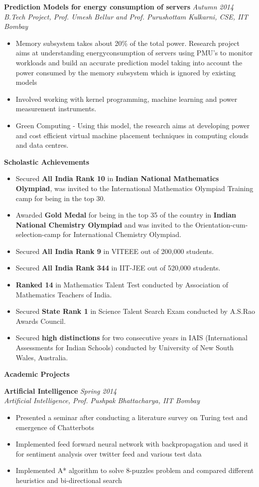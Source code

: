 \documentclass[a4paper,10pt]{article}
\newcommand{\resheading}[1]{
	{\large \colorbox{mygrey}{\begin{minipage}{\textwidth}{\textbf{#1 \vphantom{p\^{E}}}}\end{minipage}}}
}
\newcommand{\ressubheadingWithGuide}[3]{%

	\textbf{#1} \hfill \textit{#2}\null\\
	\textit{\small #3} %
	\vspace{-4pt}
}
\begin{document}
	\ressubheadingWithGuide{Prediction Models for energy consumption of servers}{Autumn 2014}{B.Tech Project, Prof. Umesh Bellur and Prof. Purushottam Kulkarni, CSE, IIT Bombay}
	\begin{itemize} \itemsep -1pt
		\item Memory subsystem takes about 20\% of the total power. Research project aims at understanding energyconsumption of servers using PMU’s to monitor workloads and build an accurate prediction model taking into account the power consumed by the memory subsystem which is ignored by existing models
		\item Involved working with kernel programming, machine learning and power measurement instruments.
		\item Green Computing - Using this model, the research aims at developing power and cost efficient virtual machine placement techniques in computing clouds and data centres.
 	\end{itemize}

\resheading{Scholastic Achievements} 
	\begin{itemize}\itemsep -1pt
	    	\item Secured \textbf{All India Rank 10} in \textbf{Indian National Mathematics Olympiad}, was invited to the International Mathematics Olympiad Training camp for being in the top 30.
			\item Awarded \textbf{Gold Medal} for being in the top 35 of the country in \textbf{Indian National Chemistry Olympiad} and was invited to the Orientation-cum-selection-camp for International Chemistry Olympiad.
			\item Secured \textbf{All India Rank 9} in VITEEE out of 200,000 students.
			\item Secured \textbf{All India Rank 344} in IIT-JEE out of 520,000 students.
			\item \textbf{Ranked 14} in Mathematics Talent Test conducted by Association of Mathematics Teachers of India.
			\item Secured \textbf{State Rank 1} in Science Talent Search Exam conducted by A.S.Rao Awards Council.
			\item Secured \textbf{high distinctions} for two consecutive years in IAIS (International Assessments for Indian Schools) conducted by University of New South Wales, Australia.
    \end{itemize}				
	
\resheading{Academic Projects}
	\ressubheadingWithGuide{Artificial Intelligence}{Spring 2014}{Artificial Intelligence, Prof. Pushpak Bhattacharya, IIT Bombay}
			\begin{itemize} \itemsep -1pt
				\item Presented a seminar after conducting a literature survey on Turing test and emergence of Chatterbots
				\item Implemented feed forward neural network with backpropagation and used it for sentiment analysis over twitter feed and various test data
				\item Implemented A* algorithm to solve 8-puzzles problem and compared different heuristics and bi-directional search
			\end{itemize}
\end{document}
